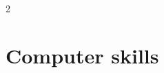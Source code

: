 \documentclass[10pt]{article} %
\begin{document}
\begin{paracol}{2}





	
	
	
	
	
	


\section{Computer skills} 






\end{paracol}
\end{document}
